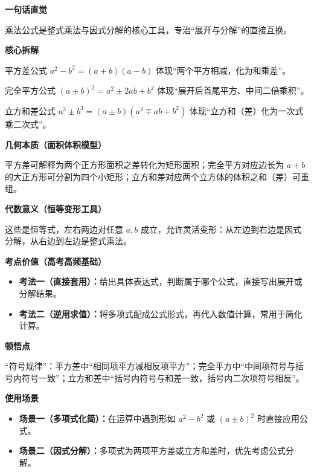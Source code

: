 \begin{explanationbox}
	\textbf{\textcolor{CExplanation}{一句话直觉}}

	乘法公式是整式乘法与因式分解的核心工具，专治“展开与分解”的直接互换。

	\medskip
	\textbf{\textcolor{CExplanation}{核心拆解}}
	\begin{description}[style=nextline, leftmargin=2.8em, labelsep=0.5em, itemsep=0.45em]
		\item[\textbf{要点一（平方差特征）：}] 平方差公式 $a^2-b^2=(a+b)(a-b)$ 体现“两个平方相减，化为和乘差”。
		\item[\textbf{要点二（完全平方特征）：}] 完全平方公式 $(a\pm b)^2=a^2\pm2ab+b^2$ 体现“展开后首尾平方、中间二倍乘积”。
		\item[\textbf{要点三（立方和差特征）：}] 立方和差公式 $a^3\pm b^3=(a\pm b)(a^2\mp ab+b^2)$ 体现“立方和（差）化为一次式乘二次式”。
	\end{description}

	\medskip
	\textbf{\textcolor{CExplanation}{几何本质（面积体积模型）}}

	平方差可解释为两个正方形面积之差转化为矩形面积；完全平方对应边长为 $a+b$ 的大正方形可分割为四个小矩形；立方和差对应两个立方体的体积之和（差）可重组。

	\medskip
	\textbf{\textcolor{CExplanation}{代数意义（恒等变形工具）}}

	这些是恒等式，左右两边对任意 $a,b$ 成立，允许灵活变形：从左边到右边是因式分解，从右边到左边是整式乘法。

	\medskip
	\textbf{\textcolor{CExplanation}{考点价值（高考高频基础）}}
	\begin{itemize}[leftmargin=*, itemsep=0.5em, topsep=0.4em]
		\item \textbf{考法一（直接套用）：}给出具体表达式，判断属于哪个公式，直接写出展开或分解结果。
		\item \textbf{考法二（逆用求值）：}将多项式配成公式形式，再代入数值计算，常用于简化计算。
	\end{itemize}

	\medskip
	\textbf{\textcolor{CExplanation}{顿悟点}}

	“符号规律”：平方差中“相同项平方减相反项平方”；完全平方中“中间项符号与括号内符号一致”；立方和差中“括号内符号与和差一致，括号内二次项符号相反”。

	\medskip
	\textbf{\textcolor{CExplanation}{使用场景}}
	\begin{itemize}[leftmargin=*, itemsep=0.5em, topsep=0.4em]
		\item \textbf{场景一（多项式化简）：}在运算中遇到形如 $a^2-b^2$ 或 $(a\pm b)^2$ 时直接应用公式。
		\item \textbf{场景二（因式分解）：}多项式为两项平方差或立方和差时，优先考虑公式分解。
	\end{itemize}
\end{explanationbox}
